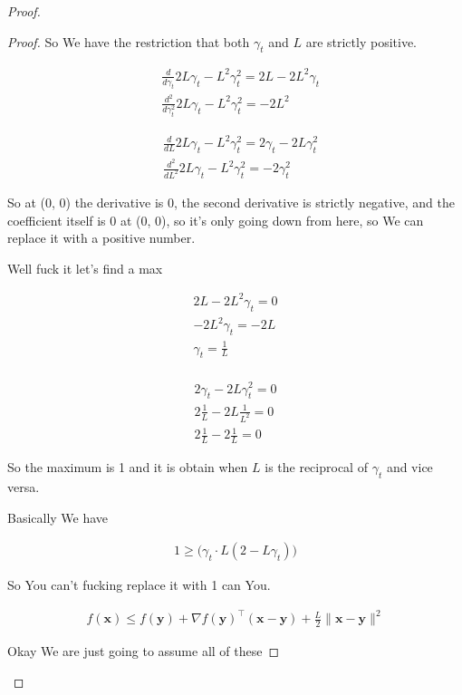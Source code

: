 \documentclass{article}
\begin{document}
\begin{proof}
\begin{proof}
		So We have the restriction that both $\gamma_t$ and $L$ are strictly positive. 
		
		\begin{align}
			&\frac{d}{d \gamma_t} 2L\gamma_t - L^2\gamma_t^2 = 2L - 2L^2\gamma_t\\
			&\frac{d^2}{d \gamma_t^2}  2L\gamma_t - L^2\gamma_t^2 = -2L^2
		\end{align}
		
		\begin{align}
			&\frac{d}{d L} 2L\gamma_t - L^2\gamma_t^2 = 2\gamma_t - 2L\gamma_t^2\\
			&\frac{d^2}{d L^2} 2L\gamma_t - L^2\gamma_t^2 = -2\gamma_t^2
		\end{align}
		
		So at (0, 0) the derivative is 0,  the second derivative is strictly negative, and the coefficient itself is 0 at (0, 0), so it's only going down from here, so We can replace it with a positive number. 
		
		Well fuck it let's find a max
		
		\begin{align}
			2L - 2L^2\gamma_t = 0\\
			- 2L^2\gamma_t = -2L\\
			\gamma_t = \frac{1}{L}\\
		\end{align}
		
		\begin{align}
			2\gamma_t - 2L\gamma_t^2 = 0\\
			2\frac{1}{L}- 2L\frac{1}{L^2} = 0\\
			2\frac{1}{L}- 2\frac{1}{L} = 0
		\end{align}
		
		So the maximum is 1 and it is obtain when $L$ is the reciprocal of $\gamma_t$ and vice versa. 
		
		Basically We have
		
		\begin{align}
			1 \ge \big(\gamma_t\cdot L(2 - L\gamma_t)  \big)
		\end{align}
		
		
		So You can't fucking replace it with 1 can You. 
		
		\begin{align}
			f(\mathbf{x}) \le f(\mathbf{y}) + \nabla f(\mathbf{y})^\top (\mathbf{x}-\mathbf{y}) + \frac{L}{2}\|\mathbf{x} - \mathbf{y}\|^2
		\end{align} 
		
		Okay We are just going to assume all of these
		

\end{proof}
\end{proof}
\end{document}
